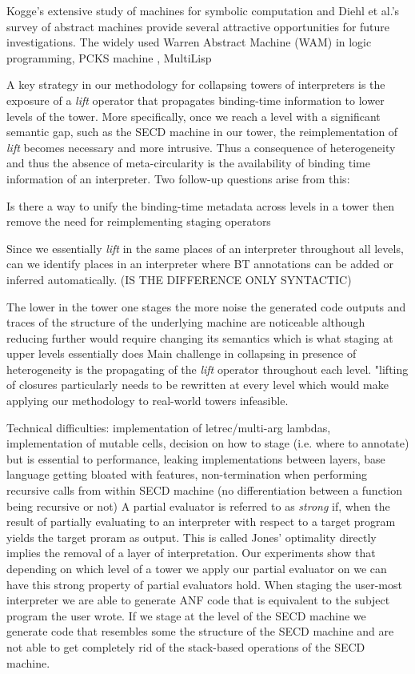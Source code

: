 \documentclass[a4paper,12pt,twoside,openright]{report}
\theoremstyle{definition}
\begin{document}
Kogge's extensive study of machines for symbolic computation \cite{kogge1990architecture} and Diehl et al.'s survey of abstract machines provide several attractive opportunities for future investigations. The widely used Warren Abstract Machine (WAM) in logic programming, PCKS machine \cite{moreau1994pcks}, MultiLisp

A key strategy in our methodology for collapsing towers of interpreters is the exposure of a \textit{lift} operator that propagates binding-time information to lower levels of the tower. More specifically, once we reach a level with a significant semantic gap, such as the SECD machine in our tower, the reimplementation of \textit{lift} becomes necessary and more intrusive. Thus a consequence of heterogeneity and thus the absence of meta-circularity is the availability of binding time information of an interpreter. Two follow-up questions arise from this:
\begin{enumerate*}
	\item Is there a way to unify the binding-time metadata across levels in a tower then remove the need for reimplementing staging operators
	\item Since we essentially \textit{lift} in the same places of an interpreter throughout all levels, can we identify places in an interpreter where BT annotations can be added or inferred automatically. (IS THE DIFFERENCE ONLY SYNTACTIC)
\end{enumerate*}

The lower in the tower one stages the more noise the generated code outputs and traces of the structure of the underlying machine are noticeable although reducing further would require changing its semantics which is what staging at upper levels essentially does
Main challenge in collapsing in presence of heterogeneity is the propagating of the \textit{lift} operator throughout each level. "lifting of closures particularly needs to be rewritten at every level which would make applying our methodology to real-world towers infeasible.

Technical difficulties: implementation of letrec/multi-arg lambdas, implementation of mutable cells, decision on how to stage (i.e. where to annotate) but is essential to performance, leaking implementations between layers, base language getting bloated with features, non-termination when performing recursive calls from within SECD machine (no differentiation between a function being recursive or not)
A partial evaluator is referred to as \textit{strong} if, when the result of partially evaluating to an interpreter with respect to a target program yields the target proram as output. This is called Jones' optimality directly implies the removal of a layer of interpretation. Our experiments show that depending on which level of a tower we apply our partial evaluator on we can have this strong property of partial evaluators hold. When staging the user-most interpreter we are able to generate ANF code that is equivalent to the subject program the user wrote. If we stage at the level of the SECD machine we generate code that resembles some the structure of the SECD machine and are not able to get completely rid of the stack-based operations of the SECD machine.
\end{document}
